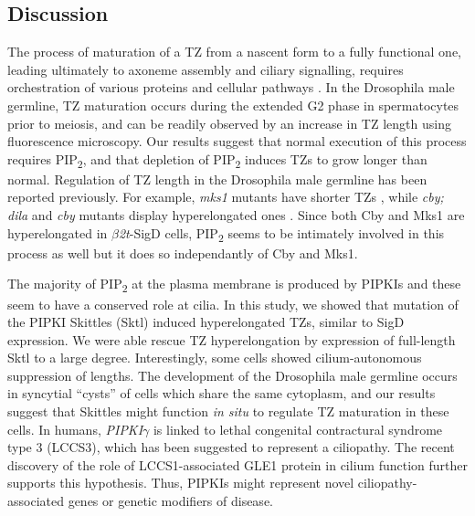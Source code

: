 \documentclass[12pt, twoside, letterpaper]{article}
\newcommand{\PIP}{PIP\textsubscript{2}}
\newcommand{\sigd}{$\beta$\textit{2t}-SigD}
\begin{document}
\begin{doublespacing}
\begin{linenumbers}
    \section{Discussion}
    The process of maturation of a TZ from a nascent form to a fully functional one,
    leading ultimately to axoneme assembly and ciliary signalling,
    requires orchestration of various proteins and cellular pathways
    \citep{reiter2012base}.
    In the Drosophila male germline, TZ maturation occurs during the
    extended G2 phase in spermatocytes prior to meiosis, and can be readily
    observed by an increase in TZ length using fluorescence microscopy.
    Our results suggest that normal execution of this process
    requires \PIP{}, and that depletion of \PIP{} induces TZs to
    grow longer than normal.
    Regulation of TZ length in the Drosophila male germline has been reported
    previously.
    For example, \textit{mks1} mutants have shorter TZs \citep{pratt2016drosophila},
    while
    \textit{cby; dila} and \textit{cby} mutants display hyperelongated ones
    \citep{enjolras2012drosophila,vieillard2016transition}.
    Since both Cby and Mks1 are hyperelongated in \sigd{} cells,
    \PIP{} seems to be intimately involved in this process as well but it does
    so independantly of Cby and Mks1.

    The majority of \PIP{} at the plasma membrane is produced by PIPKIs
    \citep{balla2013phosphoinositides, hammond2012pi4p}
    and these seem to have a conserved role at cilia.
    In this study, we showed that mutation of the PIPKI Skittles (Sktl)
    induced hyperelongated TZs, similar to SigD expression.
    We were able rescue TZ hyperelongation by expression of full-length Sktl to
    a large degree.
    Interestingly, some cells showed cilium-autonomous suppression of lengths.
    The development of the Drosophila male germline occurs in syncytial ``cysts''
    of cells which share the same cytoplasm, and
    our results suggest that Skittles might function \textit{in situ}
    to regulate TZ maturation in these cells.
    In humans, \textit{PIPKI$\gamma$} is linked to lethal congenital contractural
    syndrome type 3 (LCCS3), which has been suggested to represent a ciliopathy.
    The recent discovery of the role of LCCS1-associated GLE1 protein in cilium
    function \citep{jao2017role} further supports this hypothesis.
    Thus, PIPKIs might represent novel ciliopathy-associated genes
    or genetic modifiers of disease.
    

\end{linenumbers}
\end{doublespacing}
\end{document}
